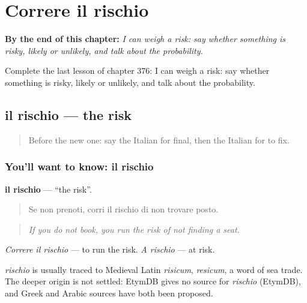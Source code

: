 
\chapter{Correre il rischio}
\label{ch:it-correre-il-rischio}

\begin{chapteropening}
\textbf{By the end of this chapter:} \emph{I can weigh a risk: say whether something is risky, likely or unlikely, and talk about the probability.}

Complete the last lesson of chapter 376: I can weigh a risk: say whether something is risky, likely or unlikely, and talk about the probability.
\end{chapteropening}

\section[il rischio]{il rischio — the risk}

\label{lesson:IT-C376-rischio}



\begin{quote}
Before the new one: say the Italian for final, then the Italian for to fix.
\end{quote}

\subsection*{You'll want to know: il rischio}
\textbf{il rischio} — \textquotedblleft{}the risk\textquotedblright{}.

\begin{quote}
Se non prenoti, corri il rischio di non trovare posto.
\end{quote}

\begin{quote}
\emph{If you do not book, you run the risk of not finding a seat.}
\end{quote}

\emph{Correre il rischio} — to run the risk. \emph{A rischio} — at risk.

\begin{cousinweb}
\emph{rischio} is usually traced to Medieval Latin \emph{risicum}, \emph{resicum}, a word of sea trade. The deeper origin is not settled: EtymDB gives no source for \emph{rischio} (EtymDB), and Greek and Arabic sources have both been proposed.
\end{cousinweb}

